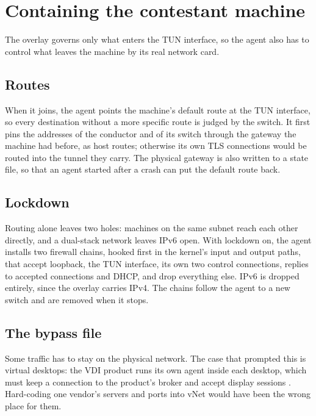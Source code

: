 \documentclass[11pt,a4paper]{article}
\begin{document}
\hypertarget{containing-the-contestant-machine}{%
\section{Containing the contestant machine}\label{containing-the-contestant-machine}}

The overlay governs only what enters the TUN interface, so the agent also has to control what leaves the machine by its real network card.

\hypertarget{routes}{%
\subsection{Routes}\label{routes}}

When it joins, the agent points the machine's default route at the TUN interface, so every destination without a more specific route is judged by the switch. It first pins the addresses of the conductor and of its switch through the gateway the machine had before, as host routes; otherwise its own TLS connections would be routed into the tunnel they carry. The physical gateway is also written to a state file, so that an agent started after a crash can put the default route back.

\hypertarget{lockdown}{%
\subsection{Lockdown}\label{lockdown}}

Routing alone leaves two holes: machines on the same subnet reach each other directly, and a dual-stack network leaves IPv6 open. With lockdown on, the agent installs two firewall chains, hooked first in the kernel's input and output paths, that accept loopback, the TUN interface, its own two control connections, replies to accepted connections and DHCP, and drop everything else. IPv6 is dropped entirely, since the overlay carries IPv4. The chains follow the agent to a new switch and are removed when it stops.

\hypertarget{the-bypass-file}{%
\subsection{The bypass file}\label{the-bypass-file}}

Some traffic has to stay on the physical network. The case that prompted this is virtual desktops: the VDI product runs its own agent inside each desktop, which must keep a connection to the product's broker and accept display sessions \cite{ref9}. Hard-coding one vendor's servers and ports into vNet would have been the wrong place for them.
\end{document}
